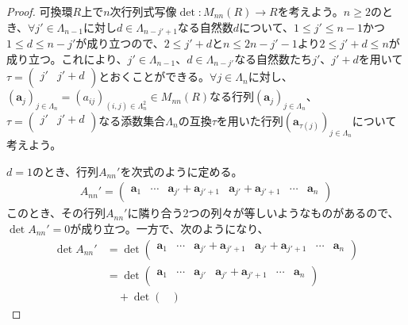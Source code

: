 \documentclass[dvipdfmx]{jsarticle}
\begin{document}
\begin{proof}
可換環$R$上で$n$次行列式写像$\det:M_{nn}(R) \rightarrow R$を考えよう。$n \geq 2$のとき、$\forall j' \in \varLambda_{n - 1}$に対し$d \in \varLambda_{n - j' + 1}$なる自然数$d$について、$1 \leq j' \leq n - 1$かつ$1 \leq d \leq n - j'$が成り立つので、$2 \leq j' + d$と$n \leq 2n - j' - 1$より$2 \leq j' + d \leq n$が成り立つ。これにより、$j' \in \varLambda_{n - 1}$、$d \in \varLambda_{n - j'}$なる自然数たち$j'$、$j' + d$を用いて$\tau = \begin{pmatrix}
j' & j' + d \\
\end{pmatrix}$とおくことができる。$\forall j \in \varLambda_{n}$に対し、$\left( \mathbf{a}_{j} \right)_{j \in \varLambda_{n}} = \left( a_{ij} \right)_{(i,j) \in \varLambda_{n}^{2}} \in M_{nn}(R)$なる行列$\left( \mathbf{a}_{j} \right)_{j \in \varLambda_{n}}$、$\tau = \begin{pmatrix}
j' & j' + d \\
\end{pmatrix}$なる添数集合$\varLambda_{n}$の互換$\tau$を用いた行列$\left( \mathbf{a}_{\tau(j)} \right)_{j \in \varLambda_{n}}$について考えよう。\par
$d = 1$のとき、行列$A_{nn}'$を次式のように定める。
\begin{align*}
A_{nn}' = \begin{pmatrix}
\mathbf{a}_{1} & \cdots & \mathbf{a}_{j'} + \mathbf{a}_{j' + 1} & \mathbf{a}_{j'} + \mathbf{a}_{j' + 1} & \cdots & \mathbf{a}_{n} \\
\end{pmatrix}
\end{align*}
このとき、その行列$A_{nn}'$に隣り合う2つの列々が等しいようなものがあるので、$\det A_{nn}' = 0$が成り立つ。一方で、次のようになり、
\begin{align*}
\det A_{nn}' &= \det\begin{pmatrix}
\mathbf{a}_{1} & \cdots & \mathbf{a}_{j'} + \mathbf{a}_{j' + 1} & \mathbf{a}_{j'} + \mathbf{a}_{j' + 1} & \cdots & \mathbf{a}_{n} \\
\end{pmatrix}\\
&= \det\begin{pmatrix}
\mathbf{a}_{1} & \cdots & \mathbf{a}_{j'} & \mathbf{a}_{j'} + \mathbf{a}_{j' + 1} & \cdots & \mathbf{a}_{n} \\
\end{pmatrix} \\
&\quad + \det\begin{pmatrix}

\end{pmatrix}
\end{align*}
\end{proof}
\end{document}
